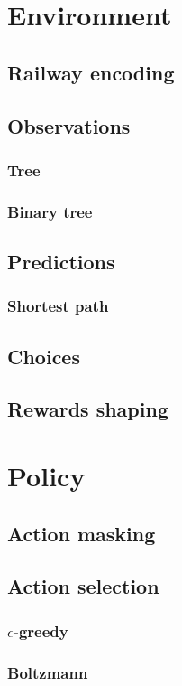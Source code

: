 \documentclass[a4paper,10pt]{report}
\begin{document}
\chapter{Environment}
\section{Railway encoding}
\section{Observations}
\subsection{Tree}
\subsection{Binary tree}
\section{Predictions}
\subsection{Shortest path}
\section{Choices}
\section{Rewards shaping}

\chapter{Policy}
\section{Action masking}
\section{Action selection}
\subsection{$\epsilon$-greedy}
\subsection{Boltzmann}
\end{document}
